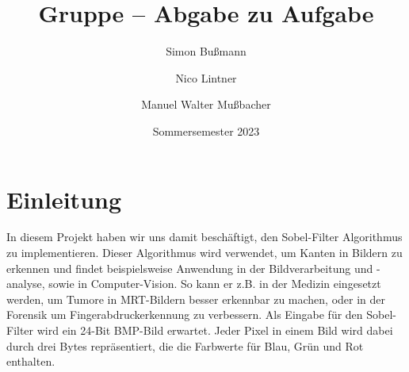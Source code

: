 \documentclass[course=erap]{aspdoc}
\author{Simon Bußmann \and Nico Lintner \and Manuel Walter Mußbacher}
\date{Sommersemester 2023}
\title{Gruppe \theGroup{} -- Abgabe zu Aufgabe \theNumber}
\begin{document}
\maketitle

\section{Einleitung}
\label{sec:einleitung}
In diesem Projekt haben wir uns damit beschäftigt, den Sobel-Filter Algorithmus zu implementieren.
Dieser Algorithmus wird verwendet, um Kanten in Bildern zu erkennen und findet beispielsweise Anwendung in der Bildverarbeitung und -analyse, sowie in Computer-Vision.
So kann er z.B. in der Medizin eingesetzt werden, um Tumore in MRT-Bildern besser erkennbar zu machen\cite{7002427},
oder in der Forensik um Fingerabdruckerkennung zu verbessern\cite{6900702}.
Als Eingabe für den Sobel-Filter wird ein 24-Bit BMP-Bild erwartet.
Jeder Pixel in einem Bild wird dabei durch drei Bytes repräsentiert, die die Farbwerte für Blau, Grün und Rot enthalten.
\end{document}
